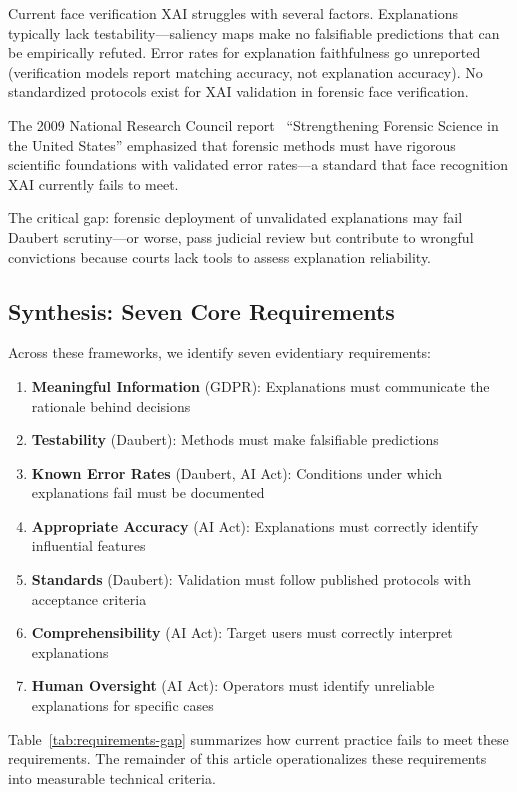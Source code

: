 Current face verification XAI struggles with several factors. Explanations typically lack testability—saliency maps make no falsifiable predictions that can be empirically refuted. Error rates for explanation faithfulness go unreported (verification models report matching accuracy, not explanation accuracy). No standardized protocols exist for XAI validation in forensic face verification.

The 2009 National Research Council report~\cite{nrc2009} ``Strengthening Forensic Science in the United States'' emphasized that forensic methods must have rigorous scientific foundations with validated error rates—a standard that face recognition XAI currently fails to meet.

The critical gap: forensic deployment of unvalidated explanations may fail Daubert scrutiny—or worse, pass judicial review but contribute to wrongful convictions because courts lack tools to assess explanation reliability.

\subsection{Synthesis: Seven Core Requirements}

Across these frameworks, we identify seven evidentiary requirements:

\begin{enumerate}[itemsep=2pt]
    \item \textbf{Meaningful Information} (GDPR): Explanations must communicate the rationale behind decisions
    \item \textbf{Testability} (Daubert): Methods must make falsifiable predictions
    \item \textbf{Known Error Rates} (Daubert, AI Act): Conditions under which explanations fail must be documented
    \item \textbf{Appropriate Accuracy} (AI Act): Explanations must correctly identify influential features
    \item \textbf{Standards} (Daubert): Validation must follow published protocols with acceptance criteria
    \item \textbf{Comprehensibility} (AI Act): Target users must correctly interpret explanations
    \item \textbf{Human Oversight} (AI Act): Operators must identify unreliable explanations for specific cases
\end{enumerate}

Table~\ref{tab:requirements-gap} summarizes how current practice fails to meet these requirements. The remainder of this article operationalizes these requirements into measurable technical criteria.
